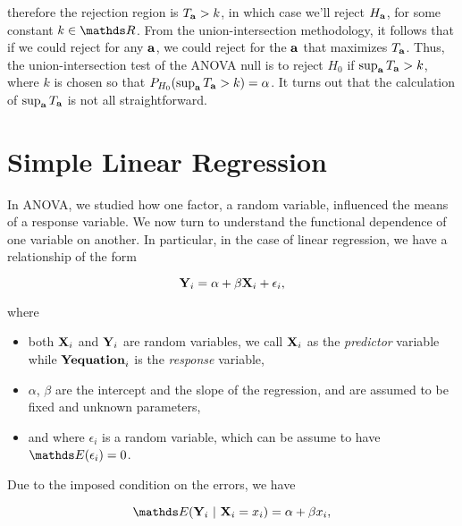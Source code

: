 \documentclass{homework}
\begin{document}
therefore the rejection region is $T_{\bf a} > k$, in which case we'll reject $H_{\bf a}$, for some constant $k \in \R$. From the union-intersection methodology, it follows that if we could reject for any ${\bf a}$, we could reject for the ${\bf a}$ that maximizes $T_{\bf a}$. Thus, the union-intersection test of the ANOVA null is to reject $H_0$ if $\sup_{\bf a} T_{\bf a} > k$, where $k$ is chosen so that $P_{H_0} (\sup_{\bf a} T_{\bf a} > k) = \alpha$. It turns out that the calculation of $\sup_{\bf a} T_{\bf a} $ is not all straightforward. \\

\clearpage

\section{Simple Linear Regression}

In ANOVA, we studied how one factor, a random variable, influenced the means of a response variable. We now turn to understand the functional dependence of one variable on another. In particular, in the case of linear regression, we have a relationship of the form

\begin{equation}
{\bf Y}_i = \alpha + \beta {\bf X}_i + \epsilon_i,
\label{linear regression 1}
\end{equation}

where 

\begin{itemize}
    \item both ${\bf X}_i$ and ${\bf Y}_i$ are random variables, we call ${\bf X}_i$ as the \textit{predictor} variable while ${\bf Yequation}_i$ is the \textit{response} variable, 
    \item $\alpha$, $\beta$ are the intercept and the slope of the regression, and are assumed to be fixed and unknown parameters, 
    \item and where $\epsilon_i$ is a random variable, which can be assume to have $\E(\epsilon_i) = 0$. \\
\end{itemize}

Due to the imposed condition on the errors, we have 

\begin{equation}
\E ({\bf Y}_i\blank|\blank{\bf X}_i = x_i) = \alpha + \beta x_i,
\label{linear regression 2}
\end{equation}
\end{document}
